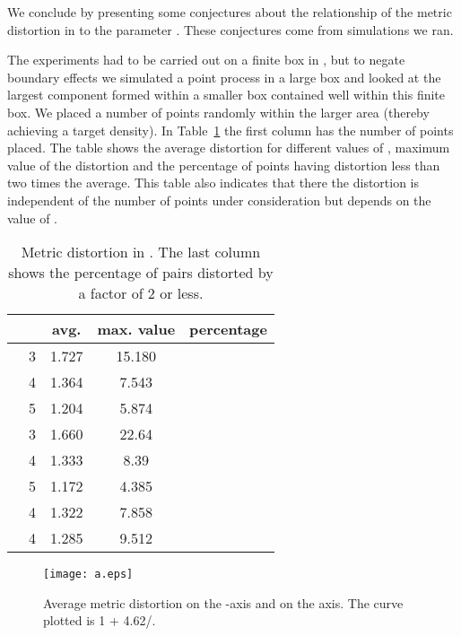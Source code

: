 \documentclass[11pt]{article}
\begin{document}
We conclude by presenting some conjectures about the relationship of
the metric distortion in  to the parameter . These
conjectures come from simulations we ran.

The experiments had to be carried out on a finite box in , but
to negate boundary effects we simulated a point process in a large box
and looked at the largest component formed within a smaller box
contained well within this finite box. We placed a number of points
randomly within the larger area (thereby achieving a target
density). In 
Table~\ref{tab:metric-distortion} the first column has the number of
points placed. The table shows the average distortion for different
values of , maximum value of the distortion and the 
percentage of points having distortion less than two times the
average. This table also indicates that there the distortion is
independent of the number of points under consideration but depends on
the value of .

\begin{table}
\begin{center}
\begin{tabular}{|c|cccc|}
\hline
  &  & avg.& max. value & percentage \\
\hline
  & 3& 1.727& 15.180& \\
\hline
  & 4& 1.364& 7.543& \\
\hline
  & 5& 1.204& 5.874& \\
\hline
  & 3& 1.660& 22.64& \\
\hline
  & 4& 1.333& 8.39& \\
\hline
  & 5& 1.172& 4.385& \\
\hline
  & 4& 1.322& 7.858& \\
\hline
  & 4& 1.285& 9.512& \\
\hline
\end{tabular}
\end{center}
\label{tab:metric-distortion}
\caption{Metric distortion in . The last column shows the
  percentage of pairs distorted by a factor of 2 or less.}
\end {table}



\begin{figure}
  \begin{center}
    \texttt{[image: a.eps]}
   \end{center}
\label{fig:plot-k-1}
\caption{Average metric distortion on the -axis and  on the
   axis. The curve plotted is 1 + 4.62/.}
\end{figure}
\end{document}
